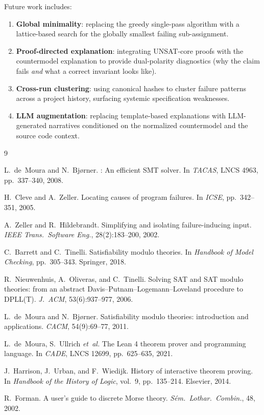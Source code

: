 \documentclass[11pt]{article}
\begin{document}
Future work includes:
\begin{enumerate}[leftmargin=1.5em]
  \item \textbf{Global minimality}: replacing the greedy single-pass
        algorithm with a lattice-based search for the globally smallest
        failing sub-assignment.
  \item \textbf{Proof-directed explanation}: integrating UNSAT-core
        proofs with the countermodel explanation to provide
        dual-polarity diagnostics (why the claim fails \emph{and} what
        a correct invariant looks like).
  \item \textbf{Cross-run clustering}: using canonical hashes to cluster
        failure patterns across a project history, surfacing systemic
        specification weaknesses.
  \item \textbf{LLM augmentation}: replacing template-based explanations
        with LLM-generated narratives conditioned on the normalized
        countermodel and the source code context.
\end{enumerate}

\begin{thebibliography}{9}

L.~de~Moura and N.~Bj{\o}rner.
: An efficient SMT solver.
\newblock In \textit{TACAS}, LNCS 4963, pp.~337--340, 2008.

H.~Cleve and A.~Zeller.
\newblock Locating causes of program failures.
\newblock In \textit{ICSE}, pp.~342--351, 2005.

A.~Zeller and R.~Hildebrandt.
\newblock Simplifying and isolating failure-inducing input.
\newblock \textit{IEEE Trans.\ Software Eng.}, 28(2):183--200, 2002.

C.~Barrett and C.~Tinelli.
\newblock Satisfiability modulo theories.
\newblock In \textit{Handbook of Model Checking}, pp.~305--343.
\newblock Springer, 2018.

R.~Nieuwenhuis, A.~Oliveras, and C.~Tinelli.
\newblock Solving {SAT} and {SAT} modulo theories: from an abstract
  Davis--Putnam--Logemann--Loveland procedure to {DPLL}(T).
\newblock \textit{J.~ACM}, 53(6):937--977, 2006.

L.~de~Moura and N.~Bj{\o}rner.
\newblock Satisfiability modulo theories: introduction and applications.
\newblock \textit{CACM}, 54(9):69--77, 2011.

L.~de~Moura, S.~Ullrich \textit{et~al.}
\newblock The {Lean} 4 theorem prover and programming language.
\newblock In \textit{CADE}, LNCS 12699, pp.~625--635, 2021.

J.~Harrison, J.~Urban, and F.~Wiedijk.
\newblock History of interactive theorem proving.
\newblock In \textit{Handbook of the History of Logic}, vol.~9, pp.~135--214.
\newblock Elsevier, 2014.

R.~Forman.
\newblock A user's guide to discrete Morse theory.
\newblock \textit{S\'em.\ Lothar.\ Combin.}, 48, 2002.

\end{thebibliography}
\end{document}
